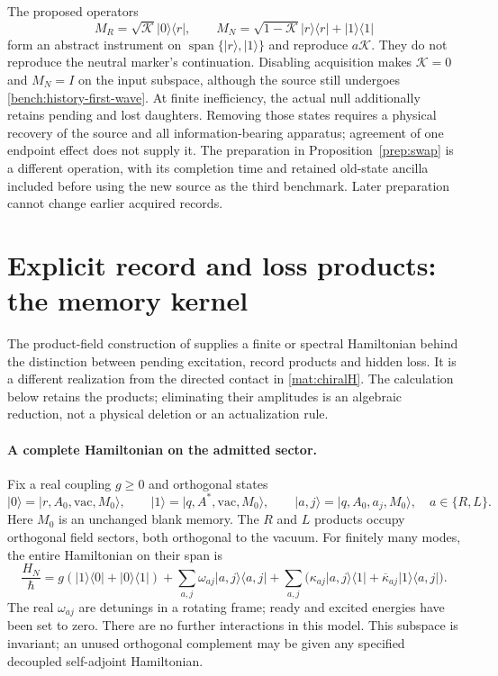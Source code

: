 \documentclass[11pt,oneside,openany]{book}
\theoremstyle{definition}
\theoremstyle{remark}\newtheorem{remark}[theorem]{Remark}
\begin{document}
The proposed operators
\[
 M_R=\sqrt{\mathcal K}|0\rangle\langle r|,\qquad
 M_N=\sqrt{1-\mathcal K}|r\rangle\langle r|
                              +|1\rangle\langle1|
\]
form an abstract instrument on
$\operatorname{span}\{|r\rangle,|1\rangle\}$ and reproduce
$a\mathcal K$. They do not reproduce the neutral marker's
continuation. Disabling acquisition makes $\mathcal K=0$ and
$M_N=I$ on the input subspace, although the source still undergoes
\eqref{bench:history-first-wave}. At finite inefficiency, the actual
null additionally retains pending and lost daughters. Removing those
states requires a physical recovery of the source and all
information-bearing apparatus; agreement of one endpoint effect
does not supply it. The preparation in Proposition~\ref{prep:swap} is a
different operation, with its completion time and retained old-state
ancilla included before using the new source as the third benchmark.
Later preparation cannot change earlier acquired records.



\section{Explicit record and loss products: the memory kernel}
\label{bench:reservoir}

The product-field construction of \cite[\S6]{C02} supplies a finite or
spectral Hamiltonian behind the distinction between pending excitation,
record products and hidden loss. It is a different realization from the
directed contact in \eqref{mat:chiralH}. The calculation below retains the
products; eliminating their amplitudes is an algebraic reduction, not a
physical deletion or an actualization rule.

\paragraph{A complete Hamiltonian on the admitted sector.}
Fix a real coupling $g\ge0$ and orthogonal states
\[
 |0\rangle=|r,A_0,\mathrm{vac},M_0\rangle,\qquad
 |1\rangle=|q,A^*,\mathrm{vac},M_0\rangle,
 \qquad |a,j\rangle=|q,A_0,a_j,M_0\rangle,
 \quad a\in\{R,L\}.
\]
Here $M_0$ is an unchanged blank memory. The $R$ and $L$ products occupy
orthogonal field sectors, both orthogonal to the vacuum. For finitely
many modes, the entire Hamiltonian on their span is
\begin{equation}
 \frac{H_N}{\hbar}
 =g(|1\rangle\langle0|+|0\rangle\langle1|)
 +\sum_{a,j}\omega_{aj}|a,j\rangle\langle a,j|
 +\sum_{a,j}\bigl(\kappa_{aj}|a,j\rangle\langle1|
                  +\overline{\kappa}_{aj}|1\rangle\langle a,j|\bigr).
 \label{bench:reservoir-finiteH}
\end{equation}
The real $\omega_{aj}$ are detunings in a rotating frame; ready and
excited energies have been set to zero. There are no further interactions
in this model. This subspace is invariant; an unused orthogonal complement
may be given any specified decoupled self-adjoint Hamiltonian.
\end{document}

